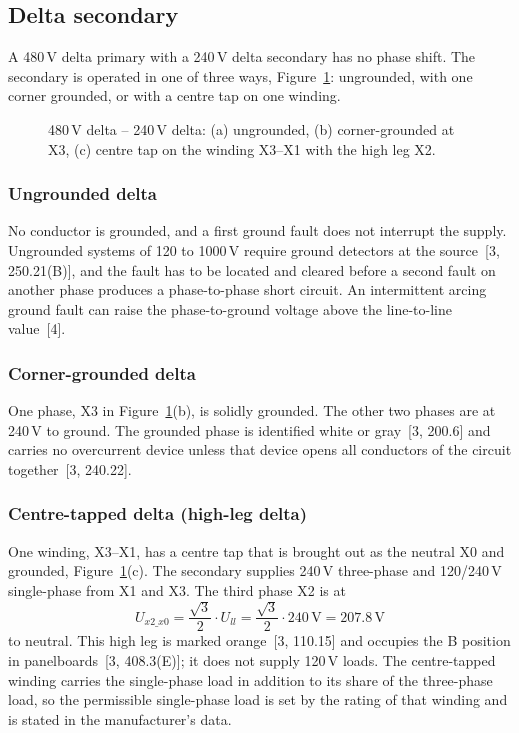 \subsection{Delta secondary}
\label{sec:na-delta}

A 480\,V delta primary with a 240\,V delta secondary has no phase shift.
The secondary is operated in one of three ways, Figure~\ref{fig:na-delta}:
ungrounded, with one corner grounded, or with a centre tap on one winding.

\begin{figure}[!ht]
  \centering
  
  \caption{480\,V delta -- 240\,V delta: (a) ungrounded, (b) corner-grounded
  at X3, (c) centre tap on the winding X3--X1 with the high leg X2.}
  \label{fig:na-delta}
\end{figure}

\subsubsection{Ungrounded delta}
No conductor is grounded, and a first ground fault does not interrupt the
supply. Ungrounded systems of 120 to 1000\,V require ground detectors at the
source~[3, 250.21(B)], and the fault has to be located and cleared before
a second fault on another phase produces a phase-to-phase short circuit.
An intermittent arcing ground fault can raise the phase-to-ground voltage
above the line-to-line value~[4].

\subsubsection{Corner-grounded delta}
One phase, X3 in Figure~\ref{fig:na-delta}(b), is solidly grounded. The
other two phases are at 240\,V to ground. The grounded phase is identified
white or gray~[3, 200.6] and carries no overcurrent device unless that
device opens all conductors of the circuit together~[3, 240.22].

\subsubsection{Centre-tapped delta (high-leg delta)}
One winding, X3--X1, has a centre tap that is brought out as the neutral X0
and grounded, Figure~\ref{fig:na-delta}(c). The secondary supplies
240\,V three-phase and 120/240\,V single-phase from X1 and X3. The third
phase X2 is at
\begin{equation}
  U_{x2\_x0} = \frac{\sqrt{3}}{2} \cdot U_{ll} = \frac{\sqrt{3}}{2} \cdot 240\,\mathrm{V} = 207.8\,\mathrm{V}
  \label{eq:na-highleg}
\end{equation}
to neutral. This high leg is marked orange~[3, 110.15] and occupies the B
position in panelboards~[3, 408.3(E)]; it does not supply 120\,V loads.
The centre-tapped winding carries the single-phase load in addition to its
share of the three-phase load, so the permissible single-phase load is set
by the rating of that winding and is stated in the manufacturer's data.
\FloatBarrier
